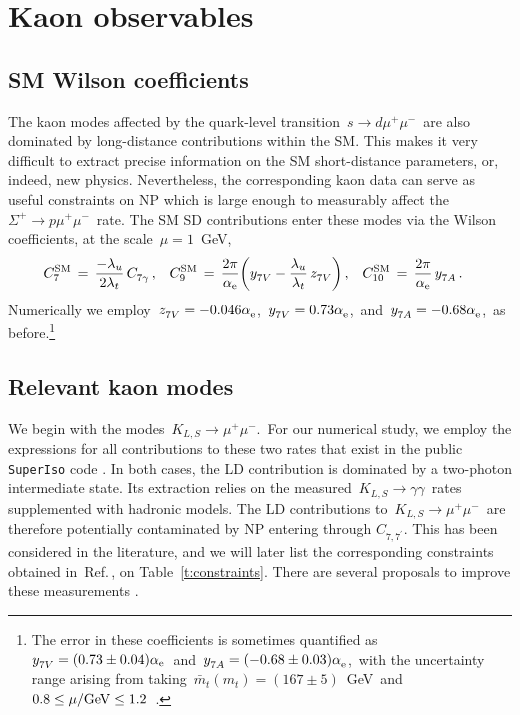 \documentclass[amsmath,amssymb,aps,nofootinbib,prd,preprint,superscriptaddress,tightenlines,a4paper,bm]{revtex4-2}
\begin{document}
\section{Kaon observables\label{kaonobs}}

\subsection{SM Wilson coefficients\label{smwc}} \vspace{-1em}

The kaon modes affected by the quark-level transition \,$s\to d\mu^+\mu^-$\,  are also dominated by long-distance contributions within the SM.
This makes it very difficult to extract precise information on the SM short-distance parameters, or, indeed, new physics. Nevertheless, the corresponding kaon data can serve as useful constraints on NP which is large enough to measurably affect the  $\Sigma^+\to p\mu^+\mu^-$\, rate.
The SM SD contributions enter these modes via the Wilson coefficients, at the scale \,$\mu=1$~GeV,
\begin{align}
    C_7^{\rm SM} & \,=\, \frac{-\lambda_u}{2\lambda_t}\, C_{7\gamma}^{} \,, &
    C_9^{\rm SM} & \,=\,
    \frac{2\pi}{\alpha_{\rm e}} \bigg( y_{7V}^{}-\frac{\lambda_u}{\lambda_t}\, z_{7V}^{} \bigg) \,, &
    C_{10}^{\rm SM} & \,=\,   \frac{2\pi}{\alpha_{\rm e}}\, y_{7A}^{} \,. &
\end{align}
Numerically we employ \,$z_{7V}^{} = -0.046\alpha_{\rm e}^{}$,  \,$y_{7V}^{} = 0.73\alpha_{\rm e}^{}$,\, and \,$y_{7A}^{} = -0.68\alpha_{\rm e}^{}$,\, as before.\footnote{The error in these coefficients is sometimes quantified as $y_{7V}^{} = (0.73\pm0.04) \alpha_{\rm e}$\, and \,$y_{7A}^{}=(-0.68\pm 0.03) \alpha_{\rm e}^{}$,\, with the uncertainty range arising from taking \,$\bar m_t(m_t)=(167\pm5)$~GeV\, and \,$0.8\leq\mu/{\rm GeV}\leq1.2$\, \cite{Isidori:2004rb}.}


\subsection{Relevant kaon modes}   \vspace{-1em}

We begin with the modes \,$K_{L,S}\to \mu^+\mu^-$.\,
For our numerical study, we employ the expressions for all contributions to these two rates that exist in the public {\tt SuperIso} code \cite{Mahmoudi:2009zz,Neshatpour:2021nbn}.
In both cases, the LD contribution is dominated by a two-photon intermediate state.
Its extraction relies on the measured \,$K_{L,S}\to \gamma\gamma$\, rates supplemented with hadronic models.
The LD contributions to \,$K_{L,S}\to \mu^+\mu^-$\, are therefore potentially contaminated by NP entering through $C_{7,7^\prime}$.
This has been considered in the literature, and we will later list the corresponding constraints obtained in~Ref.\,\cite{Mertens:2011ts}, on Table~\ref{t:constraints}.
There are several proposals to improve these measurements \cite{Anzivino:2023bhp}.
\end{document}
